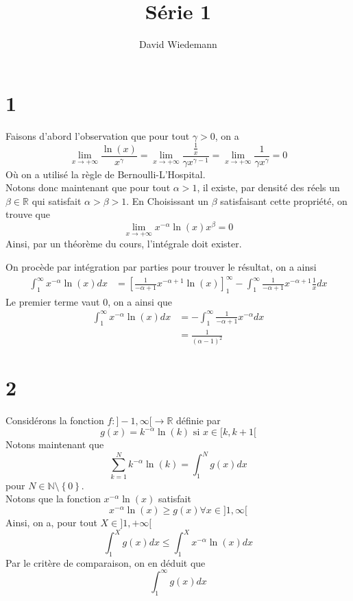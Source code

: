 \documentclass[11pt, a4paper, twoside]{article}
\begin{document}
\title{Série 1}
\author{David Wiedemann}
\maketitle
\section*{1}
Faisons d'abord l'observation que pour tout $\gamma>0$, on a
\[ 
	\lim_{x \to  + \infty} \frac{\ln( x) }{x^{\gamma}} = \lim_{x \to  + \infty} \frac{\frac{1}{x}}{\gamma x^{\gamma-1}} = \lim_{x \to  + \infty} \frac{1}{\gamma x^{\gamma}} = 0
\]
Où on a utilisé la règle de Bernoulli-L'Hospital.\\
Notons donc maintenant que pour tout $\alpha>1$, il existe, par densité des réels un $\beta \in \mathbb{R}$ qui satisfait $\alpha>\beta>1$.
En Choisissant un  $\beta$ satisfaisant cette propriété, on trouve que 
 \[ 
	 \lim_{x \to  + \infty} x^{-\alpha} \ln( x) x^{\beta} =0
\]
Ainsi, par un théorème du cours, l'intégrale doit exister.


On procède par intégration par parties pour trouver le résultat, on a ainsi
\begin{align*}
	\int_{ 1 }^{ \infty  } x^{-\alpha}\ln( x) dx &= \left[ \frac{1}{-\alpha+1}x^{-\alpha+1}\ln( x) \right]_{1}^{ \infty } - \int_{ 1 }^{ \infty  } \frac{1}{-\alpha+1}x^{-\alpha+1} \frac{1}{x} dx
\end{align*}
Le premier terme vaut 0, on a ainsi que
\begin{align*}
	\int_{ 1 }^{ \infty  } x^{-\alpha}\ln( x) dx &=  - \int_{ 1 }^{ \infty  } \frac{1}{-\alpha+1}x^{-\alpha}  dx\\
						     &=  \frac{1}{( \alpha-1) ^{2}} 
\end{align*}
\section*{2}
Considérons la fonction $f:]-1, \infty[ \to \mathbb{R}$ définie par
\[ 
	g( x) = k^{-\alpha}\ln( k)  \text{ si } x \in [ k,k+1[ 
\]
Notons maintenant que
\[ 
	\sum_{k=1}^{ N } k^{-\alpha}\ln( k) = \int_{ 1 }^{ N  } g( x) dx
\]
pour $N \in \mathbb{N}\setminus \left\{ 0 \right\} $.\\
Notons que la fonction $x^{-\alpha}\ln( x) $ satisfait
\[ 
	x^{-\alpha}\ln( x) \geq g( x) \forall x \in ]1, \infty[
\]
Ainsi, on a, pour tout $X \in ]1, + \infty[$ 
\[ 
	\int_{ 1 }^{ X }g( x) dx \leq \int_{ 1 }^{ X }x^{-\alpha}\ln( x) dx 
\]
Par le critère de comparaison, on en déduit que
\[ 
	\int_{ 1 }^{ \infty  } g( x) dx 
\]
\end{document}
